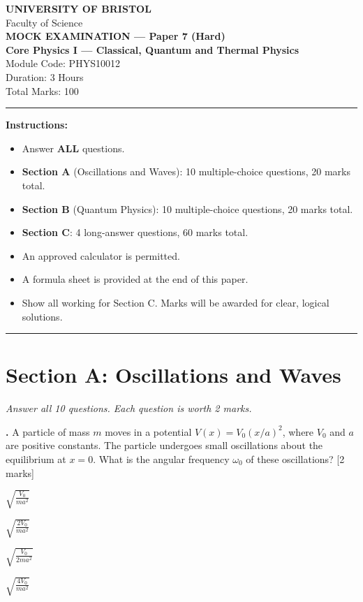 \documentclass[12pt,a4paper]{article}
\newcounter{mcqcounter}
\newcommand{\mcq}[1]{%
  \stepcounter{mcqcounter}%
  \vspace{0.3cm}%
  \noindent\textbf{\themcqcounter.} #1 \hfill [2 marks]%
  \vspace{0.1cm}%
}
\begin{document}
\begin{center}
{\Large\textbf{UNIVERSITY OF BRISTOL}}\\[0.3cm]
{\large Faculty of Science}\\[0.5cm]
{\Large\textbf{MOCK EXAMINATION --- Paper 7 (Hard)}}\\[0.3cm]
{\large\textbf{Core Physics I --- Classical, Quantum and Thermal Physics}}\\[0.2cm]
{\large Module Code: PHYS10012}\\[0.5cm]
{\large Duration: 3 Hours}\\[0.3cm]
{\large Total Marks: 100}\\[0.5cm]
\end{center}

\noindent\rule{\textwidth}{0.4pt}

\vspace{0.3cm}
\noindent\textbf{Instructions:}
\begin{itemize}[itemsep=0.1cm]
\item Answer \textbf{ALL} questions.
\item \textbf{Section A} (Oscillations and Waves): 10 multiple-choice questions, 20 marks total.
\item \textbf{Section B} (Quantum Physics): 10 multiple-choice questions, 20 marks total.
\item \textbf{Section C}: 4 long-answer questions, 60 marks total.
\item An approved calculator is permitted.
\item A formula sheet is provided at the end of this paper.
\item Show all working for Section C. Marks will be awarded for clear, logical solutions.
\end{itemize}

\noindent\rule{\textwidth}{0.4pt}
\newpage

\section*{Section A: Oscillations and Waves}
\noindent\textit{Answer all 10 questions. Each question is worth 2 marks.}\\[0.3cm]

\setcounter{mcqcounter}{0}

\mcq{A particle of mass $m$ moves in a potential $V(x) = V_0(x/a)^2$, where $V_0$ and $a$ are positive constants. The particle undergoes small oscillations about the equilibrium at $x = 0$. What is the angular frequency $\omega_0$ of these oscillations?}
\begin{choices}
\item $\displaystyle\sqrt{\frac{V_0}{ma^2}}$
\item $\displaystyle\sqrt{\frac{2V_0}{ma^2}}$
\item $\displaystyle\sqrt{\frac{V_0}{2ma^2}}$
\item $\displaystyle\sqrt{\frac{4V_0}{ma^2}}$
\end{choices}
\end{document}
